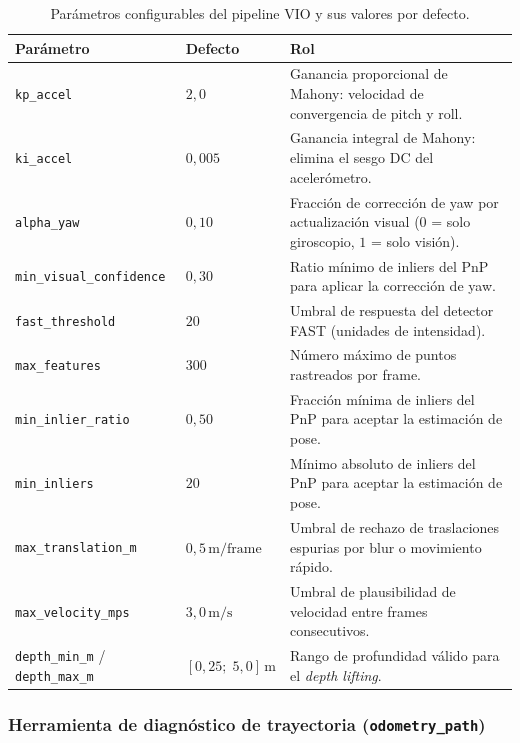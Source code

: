\begin{table}[h]
\centering
\caption{Parámetros configurables del pipeline VIO y sus valores por defecto.}
\label{tab:vio-params}
\begin{tabularx}{\textwidth}{llX}
\hline
\textbf{Parámetro} & \textbf{Defecto} & \textbf{Rol} \\
\hline
\texttt{kp\_accel}
  & $2{,}0$
  & Ganancia proporcional de Mahony: velocidad de convergencia
    de pitch y roll. \\[2pt]
\texttt{ki\_accel}
  & $0{,}005$
  & Ganancia integral de Mahony: elimina el sesgo DC del acelerómetro. \\[2pt]
\texttt{alpha\_yaw}
  & $0{,}10$
  & Fracción de corrección de yaw por actualización visual
    ($0$ = solo giroscopio, $1$ = solo visión). \\[2pt]
\texttt{min\_visual\_confidence}
  & $0{,}30$
  & Ratio mínimo de inliers del PnP para aplicar la corrección de yaw. \\[2pt]
\texttt{fast\_threshold}
  & $20$
  & Umbral de respuesta del detector FAST (unidades de intensidad). \\[2pt]
\texttt{max\_features}
  & $300$
  & Número máximo de puntos rastreados por frame. \\[2pt]
\texttt{min\_inlier\_ratio}
  & $0{,}50$
  & Fracción mínima de inliers del PnP para aceptar la estimación de pose. \\[2pt]
\texttt{min\_inliers}
  & $20$
  & Mínimo absoluto de inliers del PnP para aceptar la estimación de pose. \\[2pt]
\texttt{max\_translation\_m}
  & $0{,}5\,\text{m/frame}$
  & Umbral de rechazo de traslaciones espurias por blur o movimiento rápido. \\[2pt]
\texttt{max\_velocity\_mps}
  & $3{,}0\,\text{m/s}$
  & Umbral de plausibilidad de velocidad entre frames consecutivos. \\[2pt]
\texttt{depth\_min\_m} / \texttt{depth\_max\_m}
  & $[0{,}25;\; 5{,}0]\,\text{m}$
  & Rango de profundidad válido para el \emph{depth lifting}. \\[2pt]
\hline
\end{tabularx}
\end{table}

\subsubsection{Herramienta de diagnóstico de trayectoria (\texttt{odometry\_path})}
\label{sec:lm-vio-odom-path}

